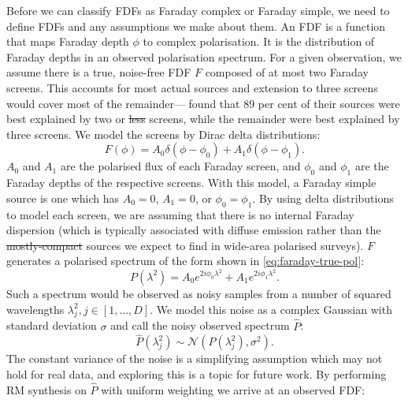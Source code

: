 \documentclass[11pt, a4paper]{book}
\providecommand{\DIFaddtex}[1]{{\protect\color{blue}\uwave{#1}}} %
\providecommand{\DIFdeltex}[1]{{\protect\color{red}\sout{#1}}}                      %
\providecommand{\DIFaddbegin}{} %
\providecommand{\DIFaddend}{} %
\providecommand{\DIFdelbegin}{} %
\providecommand{\DIFdelend}{} %
\providecommand{\DIFadd}[1]{\texorpdfstring{\DIFaddtex{#1}}{#1}} %
\providecommand{\DIFdel}[1]{\texorpdfstring{\DIFdeltex{#1}}{}} %
\newcommand{\DIFscaledelfig}{0.5}
\newlength{\DIFdelgraphicswidth} %
\newlength{\DIFdelgraphicsheight} %
\newcommand{\DIFaddincludegraphics}[2][]{{\color{blue}\fbox{\DIFOincludegraphics[#1]{#2}}}} %
\newcommand{\DIFdelincludegraphics}[2][]{%
\sbox{\DIFdelgraphicsbox}{\DIFOincludegraphics[#1]{#2}}%
\settoboxwidth{\DIFdelgraphicswidth}{\DIFdelgraphicsbox} %
\settoboxtotalheight{\DIFdelgraphicsheight}{\DIFdelgraphicsbox} %
\scalebox{\DIFscaledelfig}{%
\parbox[b]{\DIFdelgraphicswidth}{\usebox{\DIFdelgraphicsbox}\\[-\baselineskip] \rule{\DIFdelgraphicswidth}{0em}}\llap{\resizebox{\DIFdelgraphicswidth}{\DIFdelgraphicsheight}{%
\setlength{\unitlength}{\DIFdelgraphicswidth}%
\begin{picture}(1,1)%
\thicklines\linethickness{2pt} %
{\color[rgb]{1,0,0}\put(0,0){\framebox(1,1){}}}%
{\color[rgb]{1,0,0}\put(0,0){\line( 1,1){1}}}%
{\color[rgb]{1,0,0}\put(0,1){\line(1,-1){1}}}%
\end{picture}%
}\hspace*{3pt}}} %
} %
\DeclareRobustCommand{\DIFaddbegin}{\DIFOaddbegin \let\includegraphics\DIFaddincludegraphics} %
\DeclareRobustCommand{\DIFaddend}{\DIFOaddend \let\includegraphics\DIFOincludegraphics} %
\DeclareRobustCommand{\DIFdelbegin}{\DIFOdelbegin \let\includegraphics\DIFdelincludegraphics} %
\DeclareRobustCommand{\DIFdelend}{\DIFOaddend \let\includegraphics\DIFOincludegraphics} %
\begin{document}
    Before we can classify FDFs as Faraday complex or Faraday simple, we need to define FDFs and any assumptions we make about them. An FDF is a function that maps Faraday depth $\phi$ to complex polarisation. It is the distribution of Faraday depths in an observed polarisation spectrum. For a given observation, we assume \DIFaddbegin \DIFadd{that }\DIFaddend there is a true, noise-free FDF $F$ composed of at most two Faraday screens. This accounts for most actual sources \citep{anderson_broadband_2015} and extension to three screens would cover most of the remainder---\citet{osullivan_broad-band_2017} found that 89 per cent of their sources were best explained by two or \DIFdelbegin \DIFdel{less }\DIFdelend \DIFaddbegin \DIFadd{fewer }\DIFaddend screens, while the remainder were best explained by three screens. We model the screens by Dirac delta distributions:
    \begin{equation}
        \label{eq:faraday-true-fdf}
        F(\phi) = A_0 \delta(\phi - \phi_0) + A_1 \delta(\phi - \phi_1).
    \end{equation}
    $A_0$ and $A_1$ are the polarised flux of each Faraday screen, and $\phi_0$ and $\phi_1$ are the Faraday depths of the respective screens. With this model, a Faraday simple source is one which has $A_0 = 0$, $A_1 = 0$, or $\phi_0 = \phi_1$. By using delta distributions to model each screen, we are assuming that there is no internal Faraday dispersion (which is typically associated with diffuse emission rather than the \DIFdelbegin \DIFdel{mostly-compact }\DIFdelend \DIFaddbegin \DIFadd{mostly compact }\DIFaddend sources we expect to find in wide-area polarised surveys). $F$ generates a polarised spectrum of the form shown in \autoref{eq:faraday-true-pol}:
    \begin{equation}
        \label{eq:faraday-true-pol}
        P(\lambda^2) = A_0 e^{2i\phi_0\lambda^2} + A_1 e^{2i\phi_1\lambda^2}.
    \end{equation}
    Such a spectrum would be observed as noisy samples from a number of squared wavelengths $\lambda^2_j, j \in [1, \dots, D]$. We model this noise as a complex Gaussian with standard deviation $\sigma$ and call the noisy observed spectrum $\hat P$:
    \begin{equation}
      \label{eq:faraday-noisy-pol}
      \hat P(\lambda_j^2) \sim \mathcal N(P(\lambda^2_j), \sigma^2).
    \end{equation}
    The constant variance of the noise is a simplifying assumption which may not hold for real data, and exploring this is a topic for future work. By performing RM synthesis \citep{brentjens_faraday_2005} on $\hat P$ with uniform weighting we arrive at an observed FDF:
\end{document}
